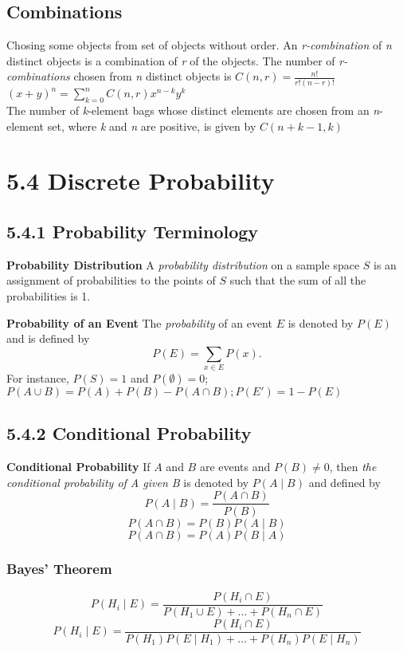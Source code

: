 \documentclass[10pt,twocolumn]{article}
\begin{document}
	\subsection*{Combinations}
	Chosing some objects from set of objects without order.
	An \textit{r-combination} of \textit{n} distinct objects is a combination of \textit{r} of the objects.  The number of \textit{r-combinations} chosen from \textit{n} distinct objects is
	$C(n,r)=\frac{n!}{r!(n-r)!}$ \\
	$(x+y)^n=\sum_{k=0}^nC(n,r)x^{n-k}y^k$ \\
	The number of \textit{k}-element bags whose distinct elements are chosen from an \textit{n}-element set, where \textit{k} and \textit{n} are positive, is given by
	$C(n+k-1, k)$


	\section*{5.4 Discrete Probability}

	\subsection*{5.4.1 Probability Terminology}

	\par\textbf{Probability Distribution} A \emph{probability distribution} on a sample space $S$ is an assignment of probabilities to the points of $S$ such that the sum of all the probabilities is 1.
	\par\noindent\textbf{Probability of an Event} The \emph{probability} of an event $E$ is denoted by $P(E)$ and is defined by
	\[P(E)=\sum_{x\in E}P(x).\]
	For instance, $P(S)=1$ and $P(\emptyset)=0$; $P(A\cup B)=P(A)+P(B)-P(A\cap B); P(E')=1-P(E)$
	
	\subsection*{5.4.2 Conditional Probability}
	
	\textbf{Conditional Probability} If $A$ and $B$ are events and $P(B)\neq0$, then \emph{the conditional probability of A given B} is denoted by $P(A\mid B)$ and defined by
	\[P(A\mid B)=\frac{P(A\cap B)}{P(B)}\]
	\[P(A\cap B)=P(B)P(A\mid B)\]
	\[P(A\cap B)=P(A)P(B\mid A)\]

	\subsubsection*{Bayes' Theorem}
	\[P(H_i\mid E)=\frac{P(H_i\cap E)}{P(H_1\cup E)+\ldots+P(H_n\cap E)}\]
	\[P(H_i\mid E)=\frac{P(H_i\cap E)}{P(H_1)P(E\mid H_1)+\ldots+P(H_n)P(E\mid  H_n)}\]
	
\end{document}
